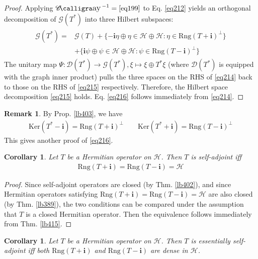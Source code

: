 \documentclass[12pt,b5paper,notitlepage]{article}
\theoremstyle{definition}
\newtheorem{rem}[df]{Remark}
\theoremstyle{plain}
\newtheorem{co}[df]{Corollary}
\DeclareMathOperator{\Cay}{\mathscr{C}\text{\kern -3pt {\calligra\large ay}}\,}
\newcommand{\Dom}{\mathscr{D}}
\newcommand{\im}{\mathbf{i}}
\newcommand{\Ker}{\mathrm{Ker}}
\newcommand{\Rng}{\mathrm{Rng}}
\newcommand{\MH}{\mathcal H}
\newcommand{\SG}{\mathscr G}
\numberwithin{equation}{section}
\begin{document}
\begin{proof}
Applying $\Cay^{-1}=\eqref{eq199}$ to Eq. \eqref{eq212} yields an orthogonal decomposition of $\SG(T^*)$ into three Hilbert subspaces:
\begin{align}\label{eq214}
\begin{aligned}
\SG(T^*)=&\SG(T)+\{-\im\eta\oplus\eta\in\MH\oplus\MH:\eta\in\Rng(T+\im)^\perp\}\\
&+\{\im\psi\oplus\psi\in\MH\oplus\MH:\psi\in\Rng(T-\im)^\perp\}
\end{aligned}
\end{align}
The unitary map $\Psi:\Dom(T^*)\rightarrow\SG(T^*),\xi\mapsto\xi\oplus T^*\xi$ (where $\Dom(T^*)$ is equipped with the graph inner product) pulls the three spaces on the RHS of \eqref{eq214} back to those on the RHS of \eqref{eq215} respectively. Therefore, the Hilbert space decomposition \eqref{eq215} holds. Eq. \eqref{eq216} follows immediately from \eqref{eq214}.
\end{proof}


\begin{rem}\label{lb418}
By Prop. \ref{lb403}, we have
\begin{align}
\Ker(T^*-\im)=\Rng(T+\im)^\perp\qquad \Ker(T^*+\im)=\Rng(T-\im)^\perp
\end{align}
This gives another proof of \eqref{eq216}.
\end{rem}



\begin{co}\label{lb420}
Let $T$ be a Hermitian operator on $\MH$. Then $T$ is self-adjoint iff
\begin{align*}
\Rng(T+\im)=\Rng(T-\im)=\MH
\end{align*}
\end{co}

\begin{proof}
Since self-adjoint operators are closed (by Thm. \ref{lb402}), and since Hermitian operators satisfying $\Rng(T+\im)=\Rng(T-\im)=\MH$ are also closed (by Thm. \ref{lb389}), the two conditions can be compared under the assumption that $T$ is a closed Hermitian operator. Then the equivalence follows immediately from Thm. \ref{lb415}.
\end{proof}

\begin{co}
Let $T$ be a Hermitian operator on $\MH$. Then $T$ is essentially self-adjoint iff both $\Rng(T+\im)$ and $\Rng(T-\im)$ are dense in $\MH$.
\end{co}
\end{document}

